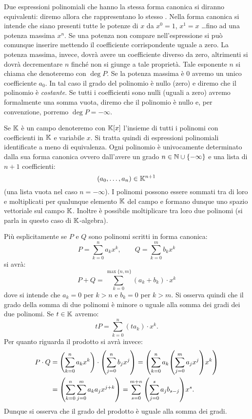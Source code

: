 Due espressioni polinomiali che hanno la stessa
forma canonica si diranno equivalenti: diremo
allora che rappresentano lo stesso .
Nella forma canonica si intende che siano presenti tutte
le potenze di $x$ da $x^0 = 1$, $x^1=x$ \dots fino ad
una potenza massima $x^n$.
Se una potenza non compare
nell'espressione si può comunque inserire mettendo
il coefficiente corrispondente uguale a zero.
La potenza massima, invece, dovrà avere un coefficiente
diverso da zero, altrimenti si dovrà decrementare
$n$ finché non si giunge a tale proprietà.
Tale esponente $n$ si chiama 
che denoteremo con $\deg P$.
Se la potenza massima è $0$ avremo un unico coefficiente
$a_0$. In tal caso il grado del polinomio è nullo (zero)
e diremo che il polinomio è \emph{costante}.
Se tutti i coefficienti sono nulli (uguali a zero)
avremo formalmente
una somma vuota, diremo che il polinomio è nullo e,
per convenzione, porremo $\deg P = -\infty$.

Se $\mathbb K$ è un campo denoteremo con $\mathbb K[x]$ l'insieme
di tutti i polinomi con coefficienti in $\mathbb K$ e variabile $x$.
Si tratta quindi di espressioni polinomiali identificate
a meno di equivalenza. Ogni polinomio è univocamente
determinato dalla sua forma canonica ovvero dall'avere
un grado $n \in \mathbb N \cup \{-\infty\}$ e una lista
di $n+1$ coefficienti:
\[
  (a_0, \dots, a_n) \in \mathbb K^{n+1}
\]
(una lista vuota nel caso $n=-\infty$).
I polinomi possono essere sommati tra di loro
e moltiplicati per qualunque elemento $\mathbb K$ del campo
e formano dunque uno spazio vettoriale
sul campo $\mathbb K$. Inoltre è possibile moltiplicare
tra loro due polinomi (si parla in questo
caso di $\mathbb K$-algebra).

Più esplicitamente se $P$ e $Q$ sono polinomi
scritti in forma canonica:
\[
  P = \sum_{k=0}^n a_k x^k, \qquad Q = \sum_{k=0}^m b_k x^k
\]
si avrà:
\[
  P + Q = \sum_{k=0}^{\max\{n,m\}} (a_k+b_k) \cdot x^k
\]
dove si intende che $a_k=0$ per $k>n$ e $b_k=0$ per $k>m$.
Si osserva quindi che il grado della somma di due polinomi
è minore o uguale alla somma dei gradi dei due polinomi.
Se $t\in \mathbb K$ avremo:
\[
  t P = \sum_{k=0}^n (ta_k)\cdot x^k.
\]
Per quanto riguarda il prodotto si avrà invece:
\begin{align*}
  P\cdot Q
  &= {\left( \sum_{k=0}^n a_k x^k \right)}\cdot {\left( \sum_{j=0}^n b_j x^j \right)}
  = {\left( \sum_{k=0}^n a_k {\left( \sum_{j=0}^m a_j x^j \right)} x^k \right)} \\
  &= {\left( \sum_{k=0}^n \sum_{j=0}^m a_k a_j x^{j+k} \right)}
  = \sum_{s=0}^{m+n} {\left( \sum_{j=0}^s a_j b_{s-j} \right)} x^s.
\end{align*}
Dunque si osserva che il grado del prodotto è uguale
alla somma dei gradi.

